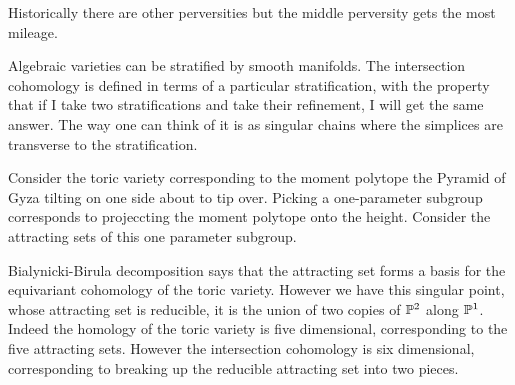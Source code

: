 \documentclass[12pt]{article}
\begin{document}
\hfill

\begin{remark}
    Historically there are other perversities but the middle perversity gets the most mileage.
\end{remark}

Algebraic varieties can be stratified by smooth manifolds. The intersection cohomology
is defined in terms of a particular stratification, with the property that if I take 
two stratifications and take their refinement, I will get the same answer.
The way one can think of it is as singular chains where the simplices are transverse
to the stratification.

\begin{example}
    Consider the toric variety corresponding to the moment polytope the Pyramid of Gyza tilting
    on one side about to tip over. Picking a one-parameter subgroup corresponds to 
    projeccting the moment polytope onto the height. Consider the attracting sets of this one parameter subgroup.

    \hfill

    Bialynicki-Birula decomposition says that the attracting set forms a basis for the
    equivariant cohomology of the toric variety. However we have this singular point, whose 
    attracting set is reducible, it is the union of two copies of $\P^2$ along $\P^1$. 
    Indeed the homology of the toric variety is five dimensional, corresponding to the 
    five attracting sets. However the intersection cohomology is six dimensional, corresponding
    to breaking up the reducible attracting set into two pieces.
\end{example}
\end{document}
